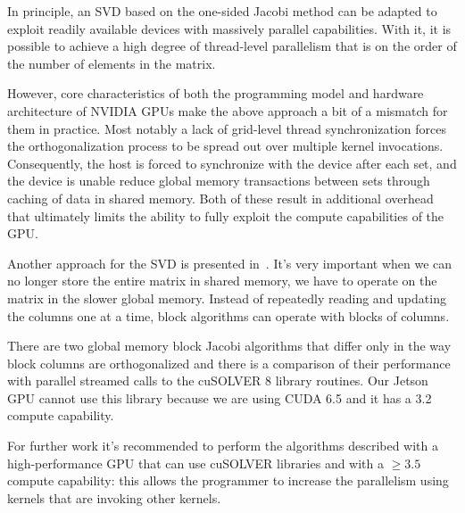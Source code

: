 In principle, an SVD based on the one-sided Jacobi method can be adapted to exploit readily available devices with massively parallel capabilities. With it, it is possible to achieve a high degree of thread-level parallelism that is on the order of the number of elements in the matrix.

However, core characteristics of both the programming model and hardware architecture of NVIDIA GPUs make the above approach a bit of a mismatch for them in practice. Most notably a lack of grid-level thread synchronization forces the orthogonalization process to be spread out over multiple kernel invocations. Consequently, the host is forced to synchronize with the device after each set, and the device is unable reduce global memory transactions between sets through caching of data in shared memory. Both of these result in additional overhead that ultimately limits the ability to fully exploit the compute capabilities of the GPU.

Another approach for the SVD is presented in~\cite{Boukaram:SVD}. It's very important when we can no longer store the entire matrix in shared memory, we have to operate on the
matrix in the slower global memory. Instead of repeatedly reading and updating the columns one at a time, block algorithms can operate with blocks of columns.

There are two global memory block Jacobi algorithms that differ only in the way block columns are orthogonalized and there is a comparison of their performance with parallel streamed calls to the cuSOLVER 8 library routines. Our Jetson GPU cannot use this library because we are using CUDA 6.5 and it has a 3.2 compute capability. 

For further work it's recommended to perform the algorithms described with a high-performance GPU that can use cuSOLVER libraries and with a $\geq 3.5$ compute capability: this allows the programmer to increase the parallelism using kernels that are invoking other kernels.